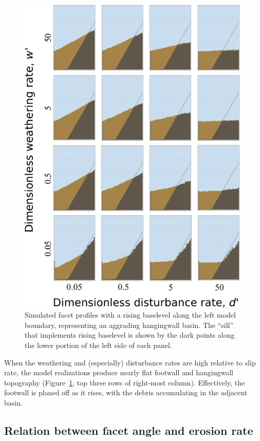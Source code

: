 \begin{figure}[ht!]
\centerline{\includegraphics[scale=1.5]{figure13.pdf}}
\caption{Simulated facet profiles with a rising baselevel along the left model boundary, representing an aggrading hangingwall basin. The ``sill'' that implements rising baselevel is shown by the dark points along the lower portion of the left side of each panel.}
\label{fig:baselevelrise}
\end{figure}

When the weathering and (especially) disturbance rates are high relative to slip rate, the model realizations produce nearly flat footwall and hangingwall topography (Figure~\ref{fig:baselevelrise}, top three rows of right-most column). Effectively, the footwall is planed off as it rises, with the debris accumulating in the adjacent basin.

\subsection{Relation between facet angle and erosion rate}

